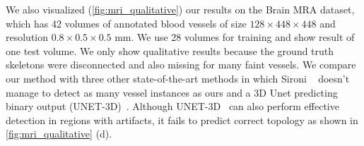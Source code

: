 We also visualized (\autoref{fig:mri_qualitative}) our results on the Brain MRA dataset\cite{Bullitt2005}, which has 42 volumes of annotated blood vessels of size $128\times448\times448$ and resolution $0.8\times0.5\times0.5$ mm. We use 28 volumes for training and show result of one test volume. We only show qualitative results because the ground truth skeletons were disconnected and also missing for many faint vessels. We compare our method with three other state-of-the-art methods in which Sironi \etall~\cite{sironi2015} doesn't manage to detect as many vessel instances as ours and a 3D Unet predicting binary output (UNET-3D)~\cite{cciccek20163d}. Although UNET-3D~\cite{cciccek20163d} can also perform effective detection in regions with artifacts, it fails to predict correct topology as shown in \autoref{fig:mri_qualitative} (d).

